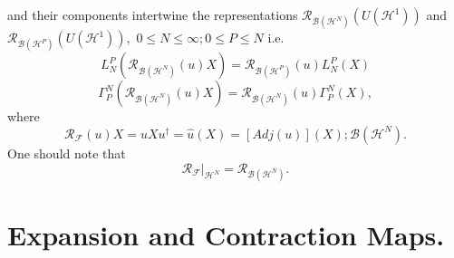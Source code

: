 \documentclass[aps,preprint]{revtex4}%
\begin{document}
and their components intertwine the representations $\mathcal{R}%
_{\mathcal{B}\left(  \mathcal{H}^{N}\right)  }\left(  U\left(  \mathcal{H}%
^{1}\right)  \right)  $ and $\mathcal{R}_{\mathcal{B}\left(  \mathcal{H}%
^{P}\right)  }\left(  U\left(  \mathcal{H}^{1}\right)  \right)  ,$ $0\leq
N\leq\infty;0\leq P\leq N$ i.e.
\begin{equation}
L_{N}^{P}\left(  \mathcal{R}_{\mathcal{B}\left(  \mathcal{H}^{N}\right)
}\left(  u\right)  X\right)  =\mathcal{R}_{\mathcal{B}\left(  \mathcal{H}%
^{P}\right)  }\left(  u\right)  L_{N}^{P}\left(  X\right)
\end{equation}%
\begin{equation}
\Gamma_{P}^{N}\left(  \mathcal{R}_{\mathcal{B}\left(  \mathcal{H}^{N}\right)
}\left(  u\right)  X\right)  =\mathcal{R}_{\mathcal{B}\left(  \mathcal{H}%
^{N}\right)  }\left(  u\right)  \Gamma_{P}^{N}\left(  X\right)  ,
\end{equation}
where
\begin{equation}
\mathcal{R}_{\mathcal{F}}\left(  u\right)  X=uXu^{\dagger}=\hat{u}\left(
X\right)  =\left[  Adj(u)\right]  (X);\mathcal{B}\left(  \mathcal{H}%
^{N}\right)  .
\end{equation}
One should note that
\begin{equation}
\left.  \mathcal{R}_{\mathcal{F}}\right\vert _{\mathcal{H}^{N}}=\mathcal{R}%
_{\mathcal{B}\left(  \mathcal{H}^{N}\right)  }.
\end{equation}


\section{Expansion and Contraction Maps.}
\end{document}
